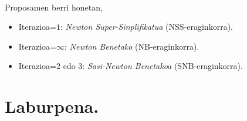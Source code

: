 \paragraph*{} Proposamen berri honetan,
\begin{itemize}
\item Iterazioa=$1$: \emph{Newton Super-Sinplifikatua} (NSS-eraginkorra).
\item Iterazioa=$\infty$: \emph{Newton Benetako} (NB-eraginkorra).
\item Iterazioa=$2$ edo $3$: \emph{Sasi-Newton Benetakoa} (SNB-eraginkorra).
\end{itemize}

\section{Laburpena.}